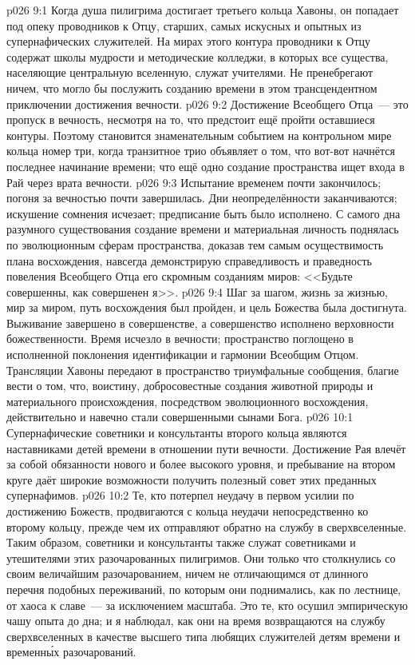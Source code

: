 \vs p026 9:1 Когда душа пилигрима достигает третьего кольца Хавоны, он попадает под опеку проводников к Отцу, старших, самых искусных и опытных из супернафических служителей. На мирах этого контура проводники к Отцу содержат школы мудрости и методические колледжи, в которых все существа, населяющие центральную вселенную, служат учителями. Не пренебрегают ничем, что могло бы послужить созданию времени в этом трансцендентном приключении достижения вечности.
\vs p026 9:2 Достижение Всеобщего Отца~--- это пропуск в вечность, несмотря на то, что предстоит ещё пройти оставшиеся контуры. Поэтому становится знаменательным событием на контрольном мире кольца номер три, когда транзитное трио объявляет о том, что вот\hyp{}вот начнётся последнее начинание времени; что ещё одно создание пространства ищет входа в Рай через врата вечности.
\vs p026 9:3 \pc Испытание временем почти закончилось; погоня за вечностью почти завершилась. Дни неопределённости заканчиваются; искушение сомнения исчезает; предписание быть  было исполнено. С самого дна разумного существования создание времени и материальная личность поднялась по эволюционным сферам пространства, доказав тем самым осуществимость плана восхождения, навсегда демонстрирую справедливость и праведность повеления Всеобщего Отца его скромным созданиям миров: <<Будьте совершенны, как совершенен я>>.
\vs p026 9:4 Шаг за шагом, жизнь за жизнью, мир за миром, путь восхождения был пройден, и цель Божества была достигнута. Выживание завершено в совершенстве, а совершенство исполнено верховности божественности. Время исчезло в вечности; пространство поглощено в исполненной поклонения идентификации и гармонии Всеобщим Отцом. Трансляции Хавоны передают в пространство триумфальные сообщения, благие вести о том, что, воистину, добросовестные создания животной природы и материального происхождения, посредством эволюционного восхождения, действительно и навечно стали совершенными сынами Бога.
\vs p026 10:1 Супернафические советники и консультанты второго кольца являются наставниками детей времени в отношении пути вечности. Достижение Рая влечёт за собой обязанности нового и более высокого уровня, и пребывание на втором круге даёт широкие возможности получить полезный совет этих преданных супернафимов.
\vs p026 10:2 \pc Те, кто потерпел неудачу в первом усилии по достижению Божеств, продвигаются с кольца неудачи непосредственно ко второму кольцу, прежде чем их отправляют обратно на службу в сверхвселенные. Таким образом, советники и консультанты также служат советниками и утешителями этих разочарованных пилигримов. Они только что столкнулись со своим величайшим разочарованием, ничем не отличающимся от длинного перечня подобных переживаний, по которым они поднимались, как по лестнице, от хаоса к славе~--- за исключением масштаба. Это те, кто осушил эмпирическую чашу опыта до дна; и я наблюдал, как они на время возвращаются на службу сверхвселенных в качестве высшего типа любящих служителей детям времени и временн\'ых разочарований.

